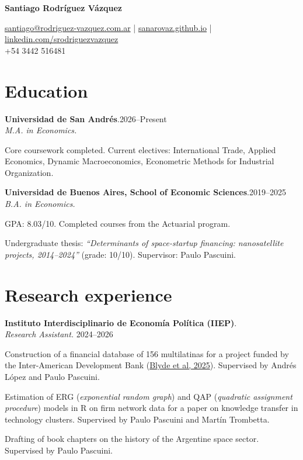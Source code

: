 \documentclass[11pt]{article}
\newcommand{\cvname}{Santiago Rodríguez Vázquez}
\newcommand{\entrydate}[1]{\hfill{\small{#1}}}
\begin{document}
\thispagestyle{firstpage}

{\LARGE\bfseries {\cvname}}

\href{mailto:santiago@rodriguez-vazquez.com.ar}{santiago@rodriguez-vazquez.com.ar} | \href{https://sanarovaz.github.io}{sanarovaz.github.io} | \href{https://www.linkedin.com/in/srodriguezvazquez/?locale=en-US}{linkedin.com/srodriguezvazquez}
\\
+54 3442 516481


\section{Education}
\textbf{Universidad de San Andrés}.\entrydate{2026--Present}\\
\textit{M.A. in Economics.}
\begin{cvitems}
  \item Core coursework completed. Current electives: International Trade, Applied Economics, Dynamic Macroeconomics, Econometric Methods for Industrial Organization.
\end{cvitems}

\smallskip
\textbf{Universidad de Buenos Aires, School of Economic Sciences}.\entrydate{2019--2025}\\
\textit{B.A. in Economics.}
\begin{cvitems}
  \item GPA: 8.03/10. Completed courses from the Actuarial program.
  \item Undergraduate thesis: \emph{``Determinants of space-startup financing:
        nanosatellite projects, 2014--2024''} (grade: 10/10). Supervisor: Paulo Pascuini.
\end{cvitems}

\section{Research experience}
\textbf{Instituto Interdisciplinario de Economía Política (IIEP)}.
\\
\textit{Research Assistant.} \entrydate{2024--2026}
\begin{cvitems}
    \item Construction of a financial database of 156 multilatinas for a project funded by the Inter-American Development Bank (\href{https://publications.iadb.org/es/multilatinas-en-movimiento-caracteristicas-motivaciones-y-lineamientos-de-politica}{Blyde et al, 2025}). Supervised by Andrés López and Paulo Pascuini.
    \item Estimation of ERG (\textit{exponential random graph}) and QAP (\textit{quadratic assignment procedure}) models in R on firm network data for a paper on knowledge transfer in technology clusters. Supervised by Paulo Pascuini and Martín Trombetta.
    \item Drafting of book chapters on the history of the Argentine space sector. Supervised by Paulo Pascuini.
\end{cvitems}
\end{document}
